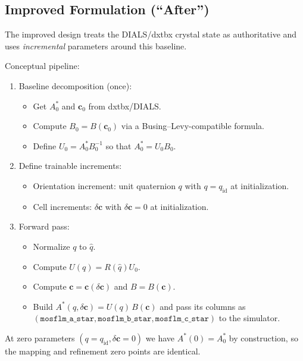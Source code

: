 \documentclass[11pt]{article}
\begin{document}
\subsection{Improved Formulation (``After'')}

The improved design treats the DIALS/dxtbx crystal state as authoritative and
uses \emph{incremental} parameters around this baseline.

Conceptual pipeline:

\begin{enumerate}
  \item Baseline decomposition (once):
        \begin{itemize}
          \item Get $A^\ast_0$ and $\mathbf{c}_0$ from dxtbx/DIALS.
          \item Compute $B_0 = B(\mathbf{c}_0)$ via a Busing--Levy-compatible
                formula.
          \item Define $U_0 = A^\ast_0 B_0^{-1}$ so that $A^\ast_0 = U_0 B_0$.
        \end{itemize}
  \item Define trainable increments:
        \begin{itemize}
          \item Orientation increment: unit quaternion $q$ with
                $q = q_{\text{id}}$ at initialization.
          \item Cell increments: $\delta\mathbf{c}$ with $\delta\mathbf{c}=0$
                at initialization.
        \end{itemize}
  \item Forward pass:
        \begin{itemize}
          \item Normalize $q$ to $\hat{q}$.
          \item Compute $U(q) = R(\hat{q}) U_0$.
          \item Compute $\mathbf{c} = \mathbf{c}(\delta\mathbf{c})$ and
                $B = B(\mathbf{c})$.
          \item Build $A^\ast(q,\delta\mathbf{c}) = U(q)\,B(\mathbf{c})$ and
                pass its columns as
                $(\texttt{mosflm\_a\_star},\texttt{mosflm\_b\_star},\texttt{mosflm\_c\_star})$
                to the simulator.
        \end{itemize}
\end{enumerate}

At zero parameters $(q=q_{\text{id}}, \delta\mathbf{c}=0)$ we have
$A^\ast(0) = A^\ast_0$ by construction, so the mapping and refinement zero
points are identical.
\end{document}
